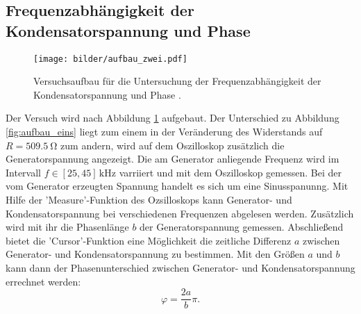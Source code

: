 \subsection{Frequenzabhängigkeit der Kondensatorspannung und Phase}
\begin{figure}
  \centering
  \texttt{[image: bilder/aufbau\_zwei.pdf]}
  \caption{Versuchsaufbau für die Untersuchung der Frequenzabhängigkeit der Kondensatorspannung und Phase \cite{anleitung354}. }
  \label{fig:aufbau_zwei}
\end{figure}
Der Versuch wird nach Abbildung \ref{fig:aufbau_zwei} aufgebaut.
Der Unterschied zu Abbildung \ref{fig:aufbau_eins} liegt zum einem
in der Veränderung des Widerstands auf $R=\SI{509.5}{\ohm}$ zum andern, wird
auf dem Oszilloskop zusätzlich die Generatorspannung angezeigt.
Die am Generator anliegende Frequenz wird im Intervall $f\in\left[25,45\right]\,\si{\kilo\hertz}$
varriiert und mit dem Oszilloskop gemessen. Bei der vom Generator erzeugten Spannung handelt es sich um
eine Sinusspanunng. Mit Hilfe der 'Measure'-Funktion des Ozsilloskops %
kann Generator- und Kondensatorspannung bei verschiedenen Frequenzen %
abgelesen werden. Zusätzlich wird mit ihr die Phasenlänge $b$ der Generatorspannung
gemessen. Abschließend bietet die 'Cursor'-Funktion eine Möglichkeit %
die zeitliche Differenz $a$ zwischen Generator- und Kondensatorspannung zu
bestimmen.
Mit den Größen $a$ und $b$ kann dann der Phasenunterschied zwischen
Generator- und Kondensatorspannung errechnet werden:
\begin{equation}
  \label{eq:phasen_unterschied}
  \varphi=\frac{2a}{b}\pi.
\end{equation}
